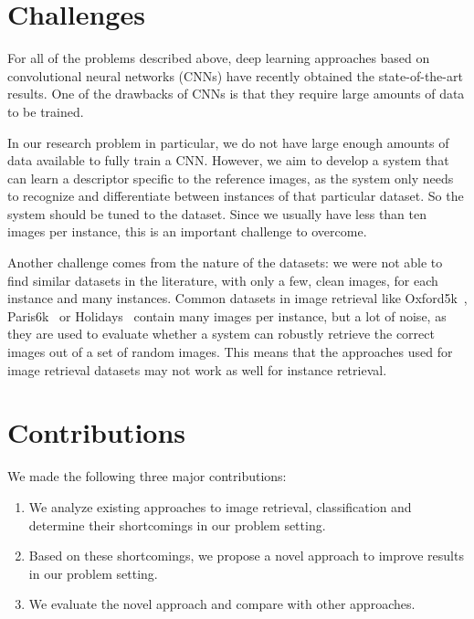 
\section{Challenges}
For all of the problems described above, deep learning approaches
based on convolutional neural networks (CNNs) have recently obtained
the state-of-the-art results. One of the drawbacks of CNNs is that
they require large amounts of data to be trained.

In our research problem in particular, we do not
have large enough amounts of data available to fully train a CNN.
However, we aim to develop a system that can learn a descriptor
specific to the reference images,
as the system only needs to recognize and differentiate between
instances of that particular dataset. So the system should be tuned to
the dataset. Since we usually have less than ten images per instance,
this is an important challenge to overcome.

Another challenge comes from the nature of the datasets: we were not
able to find similar datasets in the literature, with only a few,
clean images, for each instance and many instances.
Common datasets in image retrieval like Oxford5k~\cite{philbin_object_2007},
Paris6k~\cite{philbin_lost_2008} or Holidays~\cite{jegou_hamming_2008}
contain many images per instance, but a lot of noise,
as they are used to evaluate whether a system can robustly retrieve the
correct images out of a set of random images.
This means that the approaches used for image retrieval datasets may
not work as well for instance retrieval.

\section{Contributions}
We made the following three major contributions:
\begin{enumerate}
    \item We analyze existing approaches to image retrieval, classification
    and determine their shortcomings in our problem setting.
    \item Based on these shortcomings, we propose a novel approach
    to improve results in our problem setting.
    \item We evaluate the novel approach and compare with other approaches.
\end{enumerate}
